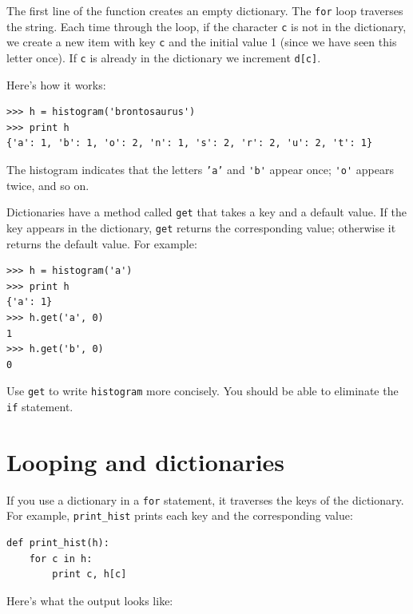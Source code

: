 \documentclass[10pt]{book}
\begin{document}

The first line of the
function creates an empty dictionary.  The {\tt for} loop traverses
the string.  Each time through the loop, if the character {\tt c} is
not in the dictionary, we create a new item with key {\tt c} and the
initial value 1 (since we have seen this letter once).  If {\tt c} is
already in the dictionary we increment {\tt d[c]}.


Here's how it works:

\beforeverb
\begin{verbatim}
>>> h = histogram('brontosaurus')
>>> print h
{'a': 1, 'b': 1, 'o': 2, 'n': 1, 's': 2, 'r': 2, 'u': 2, 't': 1}
\end{verbatim}
\afterverb
%
The histogram indicates that the letters {\tt 'a'} and \verb"'b'"
appear once; \verb"'o'" appears twice, and so on.

\begin{ex}


Dictionaries have a method called {\tt get} that takes a key
and a default value.  If the key appears in the dictionary,
{\tt get} returns the corresponding value; otherwise it returns
the default value.  For example:

\beforeverb
\begin{verbatim}
>>> h = histogram('a')
>>> print h
{'a': 1}
>>> h.get('a', 0)
1
>>> h.get('b', 0)
0
\end{verbatim}
\afterverb
%
Use {\tt get} to write {\tt histogram} more concisely.  You
should be able to eliminate the {\tt if} statement.
\end{ex}


\section{Looping and dictionaries}


If you use a dictionary in a {\tt for} statement, it traverses
the keys of the dictionary.  For example, \verb"print_hist"
prints each key and the corresponding value:

\beforeverb
\begin{verbatim}
def print_hist(h):
    for c in h:
        print c, h[c]
\end{verbatim}
\afterverb
%
Here's what the output looks like:
\end{document}
